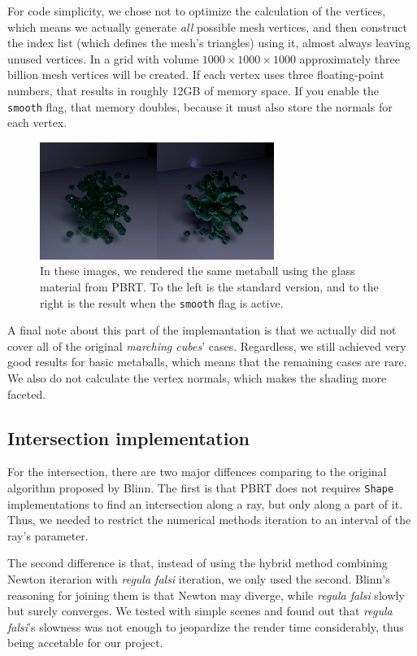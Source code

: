 \documentclass[conference]{acmsiggraph}
\begin{document}
For code simplicity, we chose not to optimize the calculation of the vertices, which 
means we actually generate \textit{all} possible mesh vertices, and then construct
the index list (which defines the mesh's triangles) using it, almost always
leaving unused vertices. In a grid with volume $1000 \times 1000 \times 1000$
approximately three billion mesh vertices will be created. If each vertex uses
three floating-point numbers, that results in roughly 12GB of memory space. If
you enable the \texttt{smooth} flag, that memory doubles, because it must also
store the normals for each vertex.

\begin{figure}[ht]
  \centering
  \includegraphics[width=3in]{images/glass-blob-comparison}
  \caption{In these images, we rendered the same metaball using the glass
           material from PBRT. To the left is the standard version, and to the
           right is the result when the \texttt{smooth} flag is active.}
  \label{img:glass-comp}
\end{figure}

A final note about this part of the implemantation is that we actually did not
cover all of the original \textit{marching cubes}' cases. Regardless, we still
achieved very good results for basic metaballs, which means that the remaining
cases are rare. We also do not calculate the vertex normals, which makes the
shading more faceted.

\subsection{Intersection implementation}

For the intersection, there are two major diffences comparing to the original
algorithm proposed by Blinn. The first is that PBRT does not requires
\texttt{Shape} implementations to find an intersection along a ray, but only
along a part of it. Thus, we needed to restrict the numerical methods iteration
to an interval of the ray's parameter.

The second difference is that, instead of using the hybrid method combining
Newton iterarion with \textit{regula falsi} iteration, we only used the second.
Blinn's reasoning for joining them is that Newton may diverge, while
\textit{regula falsi} slowly but surely converges. We tested with simple scenes
and found out that \textit{regula falsi}'s slowness was not enough to jeopardize
the render time considerably, thus being accetable for our project.
\end{document}
